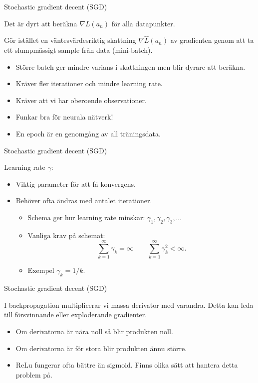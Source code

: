 \documentclass[10pt,english]{beamer}
\begin{document}
\begin{frame}{Stochastic gradient decent (SGD)}

    Det är dyrt att beräkna $\nabla L(a_n)$ för alla datapunkter.

    Gör istället en väntesvärdesriktig skattning $\nabla \hat{L}(a_n)$ av gradienten genom att ta ett slumpmässigt sample från data (mini-batch).

    \begin{itemize}
        \item Större batch ger mindre varians i skattningen men blir dyrare att beräkna.
        \item Kräver fler iterationer och mindre learning rate.
        \item Kräver att vi har oberoende observationer.
        \item Funkar bra för neurala nätverk!
        \item En epoch är en genomgång av all träningsdata.
    \end{itemize}
    
\end{frame}

\begin{frame}{Stochastic gradient decent (SGD)}
    
    Learning rate $\gamma$:
    \begin{itemize}
        \item Viktig parameter för att få konvergens.
        \item Behöver ofta ändras med antalet iterationer.
        \begin{itemize}
            \item Schema ger hur learning rate minskar: $\gamma_1, \gamma_2, \gamma_3, \ldots$
            \item Vanliga krav på schemat:
            \begin{equation*}
                \sum_{k=1}^{\infty} \gamma_k = \infty \qquad \sum_{k=1}^{\infty} \gamma_k^2 < \infty.
            \end{equation*}
            \item Exempel $\gamma_k = 1/k$.
        \end{itemize}
    \end{itemize}

\end{frame}

\begin{frame}{Stochastic gradient decent (SGD)}
    
     I backpropagation multiplicerar vi massa derivator med varandra. Detta kan leda till försvinnande eller exploderande gradienter.
    \begin{itemize}
        \item Om derivatorna är nära noll så blir produkten noll.
        \item Om derivatorna är för stora blir produkten ännu större.
        \item ReLu fungerar ofta bättre än sigmoid. Finns olika sätt att hantera detta problem på.
    \end{itemize}

\end{frame}
\end{document}
